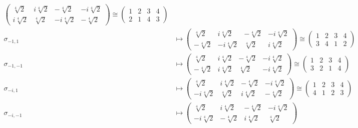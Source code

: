 \documentclass{article}
\begin{document}
\begin{enumerate}[(a)]
\begin{align*}
\begin{pmatrix}
                \sqrt[4]{2}& i\sqrt[4]{2}&- \sqrt[4]{2}&-i\sqrt[4]{2}\\
               i\sqrt[4]{2}&  \sqrt[4]{2}&-i\sqrt[4]{2}&- \sqrt[4]{2}
            \end{pmatrix} \cong \begin{pmatrix}
                1 & 2 & 3 & 4\\
                2 & 1 & 4 & 3
            \end{pmatrix}\\
            \sigma_{-1, 1} &\mapsto \begin{pmatrix}
                  \sqrt[4]{2}& i\sqrt[4]{2}&- \sqrt[4]{2}&-i\sqrt[4]{2}\\
                - \sqrt[4]{2}&-i\sqrt[4]{2}&  \sqrt[4]{2}& i\sqrt[4]{2}
            \end{pmatrix} \cong \begin{pmatrix}
                1 & 2 & 3 & 4\\
                3 & 4 & 1 & 2
            \end{pmatrix}\\
            \sigma_{-1, -1} &\mapsto \begin{pmatrix}
                  \sqrt[4]{2}& i\sqrt[4]{2}&- \sqrt[4]{2}&-i\sqrt[4]{2}\\
                - \sqrt[4]{2}& i\sqrt[4]{2}&  \sqrt[4]{2}&-i\sqrt[4]{2}
            \end{pmatrix} \cong \begin{pmatrix}
                1 & 2 & 3 & 4\\
                3 & 2 & 1 & 4
            \end{pmatrix}\\
            \sigma_{-i, 1} &\mapsto \begin{pmatrix}
                  \sqrt[4]{2}& i\sqrt[4]{2}&- \sqrt[4]{2}&-i\sqrt[4]{2}\\
                -i\sqrt[4]{2}&  \sqrt[4]{2}& i\sqrt[4]{2}&- \sqrt[4]{2}
            \end{pmatrix} \cong \begin{pmatrix}
                1 & 2 & 3 & 4\\
                4 & 1 & 2 & 3
            \end{pmatrix}\\
            \sigma_{-i, -1} &\mapsto \begin{pmatrix}
                \sqrt[4]{2}& i\sqrt[4]{2}&- \sqrt[4]{2}&-i\sqrt[4]{2}\\
              -i\sqrt[4]{2}&- \sqrt[4]{2}& i\sqrt[4]{2}&  \sqrt[4]{2}

\end{pmatrix}
\end{align*}
\end{enumerate}
\end{document}
